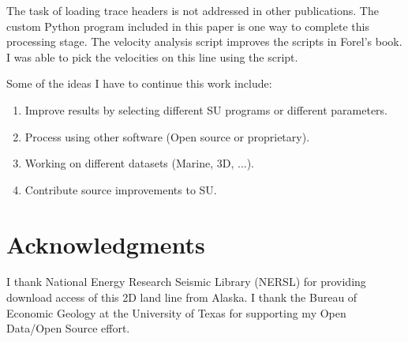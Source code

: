The task of loading trace headers is not addressed in other
publications.  The custom Python program included in this paper is one
way to complete this processing stage.  The velocity analysis script 
improves the scripts in Forel's book.  I was able to pick the velocities 
on this line using the script.

Some of the ideas I have to continue this work include:
\begin{enumerate}
\item Improve results by selecting different SU programs or different 
parameters. 
\item Process using other software (Open source or proprietary).
\item Working on different datasets (Marine, 3D, ...).
\item Contribute source improvements to SU.
\end{enumerate}

\section{Acknowledgments}
I thank National Energy Research Seismic Library (NERSL) for providing 
download access of this 2D land line from Alaska.  I thank the Bureau 
of Economic Geology at the University of Texas for supporting my 
Open Data/Open Source effort.
 



